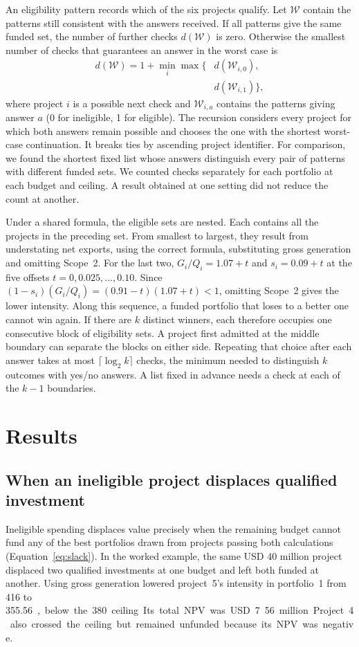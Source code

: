 An eligibility pattern records which of the six projects qualify. Let $\mathcal W$ contain the patterns still consistent with the answers received. If all patterns give the same funded set, the number of further checks $d(\mathcal W)$ is zero. Otherwise the smallest number of checks that guarantees an answer in the worst case is
\begin{equation}
\begin{aligned}
 d(\mathcal W)=1+\min_i\max\{&d(\mathcal W_{i,0}),\\ &d(\mathcal W_{i,1})\},
 \end{aligned}\label{eq:tree}
\end{equation}
where project $i$ is a possible next check and $\mathcal W_{i,a}$ contains the patterns giving answer $a$ (0 for ineligible, 1 for eligible). The recursion considers every project for which both answers remain possible and chooses the one with the shortest worst-case continuation. It breaks ties by ascending project identifier. For comparison, we found the shortest fixed list whose answers distinguish every pair of patterns with different funded sets. We counted checks separately for each portfolio at each budget and ceiling. A result obtained at one setting did not reduce the count at another.

Under a shared formula, the eligible sets are nested. Each contains all the projects in the preceding set. From smallest to largest, they result from understating net exports, using the correct formula, substituting gross generation and omitting Scope~2. For the last two, $G_i/Q_i=1.07+t$ and $s_i=0.09+t$ at the five offsets $t=0,0.025,\ldots,0.10$. Since $(1-s_i)(G_i/Q_i)=(0.91-t)(1.07+t)<1$, omitting Scope~2 gives the lower intensity. Along this sequence, a funded portfolio that loses to a better one cannot win again. If there are $k$ distinct winners, each therefore occupies one consecutive block of eligibility sets. A project first admitted at the middle boundary can separate the blocks on either side. Repeating that choice after each answer takes at most $\lceil\log_2 k\rceil$ checks, the minimum needed to distinguish $k$ outcomes with yes/no answers. A list fixed in advance needs a check at each of the $k-1$ boundaries.

\section{Results}
\subsection{When an ineligible project displaces qualified investment}
Ineligible spending displaces value precisely when the remaining budget cannot fund any of the best portfolios drawn from projects passing both calculations (Equation~\eqref{eq:slack}). In the worked example, the same USD 40 million project displaced two qualified investments at one budget and left both funded at another. Using gross generation lowered project~5's intensity in portfolio~1 from 416 to 355.56~\unit, below the 380 ceiling. Its total NPV was USD 7.56 million. Project~4 also crossed the ceiling but remained unfunded because its NPV was negative.

